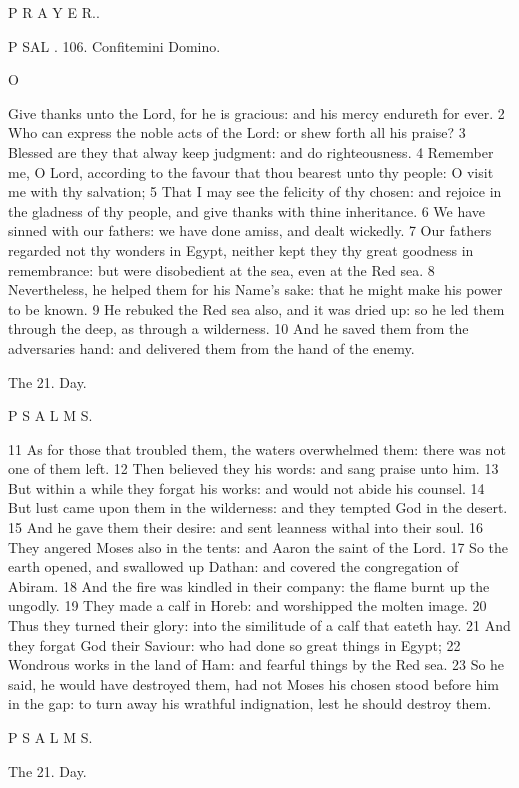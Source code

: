 P R A Y E R..

P SAL . 106. Confitemini Domino.

O

Give thanks unto the Lord, for he is gracious: and his mercy endureth for ever. 2 Who can express the noble acts of the Lord: or shew forth all his praise? 3 Blessed are they that alway keep judgment: and do righteousness. 4 Remember me, O Lord, according to the favour that thou bearest unto thy people: O visit me with thy salvation; 5 That I may see the felicity of thy chosen: and rejoice in the gladness of thy people, and give thanks with thine inheritance. 6 We have sinned with our fathers: we have done amiss, and dealt wickedly. 7 Our fathers regarded not thy wonders in Egypt, neither kept they thy great goodness in remembrance: but were disobedient at the sea, even at the Red sea. 8 Nevertheless, he helped them for his Name’s sake: that he might make his power to be known. 9 He rebuked the Red sea also, and it was dried up: so he led them through the deep, as through a wilderness. 10 And he saved them from the adversaries hand: and delivered them from the hand of the enemy.

The 21. Day.

P S A L M S.

11 As for those that troubled them, the waters overwhelmed them: there was not one of them left. 12 Then believed they his words: and sang praise unto him. 13 But within a while they forgat his works: and would not abide his counsel. 14 But lust came upon them in the wilderness: and they tempted God in the desert. 15 And he gave them their desire: and sent leanness withal into their soul. 16 They angered Moses also in the tents: and Aaron the saint of the Lord. 17 So the earth opened, and swallowed up Dathan: and covered the congregation of Abiram. 18 And the fire was kindled in their company: the flame burnt up the ungodly. 19 They made a calf in Horeb: and worshipped the molten image. 20 Thus they turned their glory: into the similitude of a calf that eateth hay. 21 And they forgat God their Saviour: who had done so great things in Egypt; 22 Wondrous works in the land of Ham: and fearful things by the Red sea. 23 So he said, he would have destroyed them, had not Moses his chosen stood before him in the gap: to turn away his wrathful indignation, lest he should destroy them.

P S A L M S.

The 21. Day.

